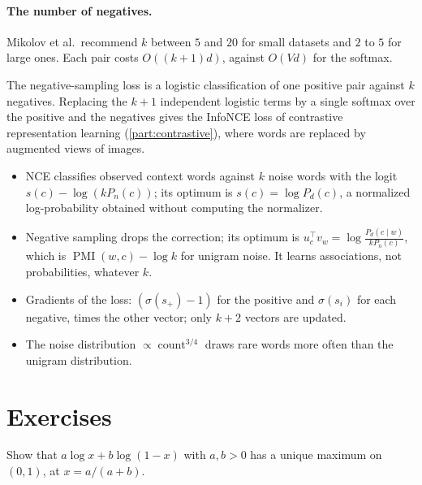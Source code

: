 \begin{notechapter}
\paragraph{The number of negatives.} Mikolov et al.\ recommend $k$ between $5$ and $20$ for small datasets
and $2$ to $5$ for large ones. Each pair costs $O((k + 1)d)$, against $O(Vd)$ for the softmax.

\begin{remark}
The negative-sampling loss is a logistic classification of one positive pair against $k$
negatives. Replacing the $k + 1$ independent logistic terms by a single softmax over the positive
and the negatives gives the InfoNCE loss of contrastive representation learning
(\cref{part:contrastive}), where words are replaced by augmented views of images.
\end{remark}

\begin{chaptersummary}
\begin{itemize}
  \item NCE classifies observed context words against $k$ noise words with the logit $s(c) - \log(kP_n(c))$; its
        optimum is $s(c) = \log P_d(c)$, a normalized log-probability obtained without computing the normalizer.
  \item Negative sampling drops the correction; its optimum is $u_c^\top v_w = \log\frac{P_d(c\mid w)}{kP_n(c)}$, which is $\operatorname{PMI}(w, c) - \log k$ for unigram noise. It
        learns associations, not probabilities, whatever $k$.
  \item Gradients of the loss: $(\sigma(s_+) - 1)$ for the positive and $\sigma(s_i)$ for each negative, times the other vector;
        only $k + 2$ vectors are updated.
  \item The noise distribution $\propto\operatorname{count}^{3/4}$ draws rare words more often than the unigram distribution.
\end{itemize}
\end{chaptersummary}

\section*{Exercises}

\begin{exercise}\label{nce-negative-sampling:exr:1}
Show that $a\log x + b\log(1 - x)$ with $a, b > 0$ has a unique maximum on $(0, 1)$, at $x = a/(a + b)$.
\end{exercise}


\end{notechapter}
